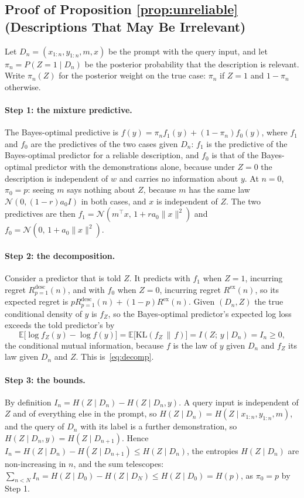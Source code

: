 \documentclass{article}
\newcommand{\E}{\mathbb{E}}
\begin{document}
\subsection{Proof of Proposition \ref{prop:unreliable} (Descriptions That May Be Irrelevant)}\label{app:reliability}
Let $D_n = (x_{1:n}, y_{1:n}, m, x)$ be the prompt with the query input, and let $\pi_n = P(Z = 1 \mid D_n)$ be the posterior probability that the description is relevant. Write $\pi_n(Z)$ for the posterior weight on the true case: $\pi_n$ if $Z = 1$ and $1 - \pi_n$ otherwise.

\paragraph{Step 1: the mixture predictive.}
The Bayes-optimal predictive is $f(y) = \pi_n f_1(y) + (1 - \pi_n) f_0(y)$, where $f_1$ and $f_0$ are the predictives of the two cases given $D_n$: $f_1$ is the predictive of the Bayes-optimal predictor for a reliable description, and $f_0$ is that of the Bayes-optimal predictor with the demonstrations alone, because under $Z = 0$ the description is independent of $w$ and carries no information about $y$. At $n = 0$, $\pi_0 = p$: seeing $m$ says nothing about $Z$, because $m$ has the same law $\mathcal{N}(0, (1-r) a_0 I)$ in both cases, and $x$ is independent of $Z$. The two predictives are then $f_1 = \mathcal{N}(m^\top x,\, 1 + r a_0\|x\|^2)$ and $f_0 = \mathcal{N}(0,\, 1 + a_0\|x\|^2)$.

\paragraph{Step 2: the decomposition.}
Consider a predictor that is told $Z$. It predicts with $f_1$ when $Z=1$, incurring regret $R^{\mathrm{desc}}_{p=1}(n)$, and with $f_0$ when $Z=0$, incurring regret $R^{\mathrm{ex}}(n)$, so its expected regret is $p R^{\mathrm{desc}}_{p=1}(n) + (1-p) R^{\mathrm{ex}}(n)$. Given $(D_n, Z)$ the true conditional density of $y$ is $f_Z$, so the Bayes-optimal predictor's expected log loss exceeds the told predictor's by
\[
\E\big[\log f_Z(y) - \log f(y)\big] = \E\big[\mathrm{KL}(f_Z \,\|\, f)\big] = I(Z;\, y \mid D_n) = I_n \ge 0,
\]
the conditional mutual information, because $f$ is the law of $y$ given $D_n$ and $f_Z$ its law given $D_n$ and $Z$. This is~\eqref{eq:decomp}.

\paragraph{Step 3: the bounds.}
By definition $I_n = H(Z \mid D_n) - H(Z \mid D_n, y)$. A query input is independent of $Z$ and of everything else in the prompt, so $H(Z \mid D_n) = H(Z \mid x_{1:n}, y_{1:n}, m)$, and the query of $D_n$ with its label is a further demonstration, so $H(Z \mid D_n, y) = H(Z \mid D_{n+1})$. Hence $I_n = H(Z \mid D_n) - H(Z \mid D_{n+1}) \le H(Z \mid D_n)$, the entropies $H(Z \mid D_n)$ are non-increasing in $n$, and the sum telescopes: $\sum_{n < N} I_n = H(Z \mid D_0) - H(Z \mid D_N) \le H(Z \mid D_0) = H(p)$, as $\pi_0 = p$ by Step 1.
\end{document}
